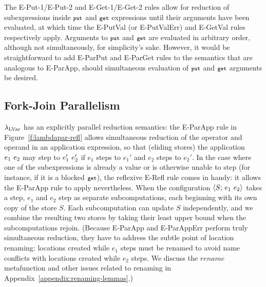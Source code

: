 The {\sc E-Put-1/E-Put-2} and {\sc E-Get-1/E-Get-2} rules allow for
reduction of subexpressions inside $\mbox{\footnotesize \texttt{put}}$ and $\mbox{\footnotesize \texttt{get}}$ expressions until
their arguments have been evaluated, at which time the {\sc E-PutVal}
(or {\sc E-PutValErr}) and {\sc E-GetVal} rules respectively apply.
Arguments to $\mbox{\footnotesize \texttt{put}}$ and $\mbox{\footnotesize \texttt{get}}$ are evaluated in arbitrary order,
although not simultaneously, for simplicity's sake.
However, it would be straightforward to
add {\sc E-ParPut} and {\sc E-ParGet} rules to the semantics that are analogous
to {\sc E-ParApp}, should simultaneous evaluation of $\mbox{\footnotesize \texttt{put}}$ and $\mbox{\footnotesize \texttt{get}}$
arguments be desired.

\FigLambdaparGrammar

\FigLambdaparRefl




\subsection{Fork-Join Parallelism}\label{subsection:fork-join}


$\textup{\ensuremath{\lambda_{\textrm{LVar}}}}$ has an explicitly parallel reduction semantics: the {\sc
  E-ParApp} rule in Figure~\ref{f:lambdapar-refl} allows simultaneous
reduction of the operator and operand in an application expression, so
that (eliding stores) the application $e_1~e_2$ may step to
$e_1'~e_2'$ if $e_1$ steps to $e_1'$ and $e_2$ steps to $e_2'$.
In the case where one of the subexpressions is already a value
or is otherwise unable to step (for instance, if it is
a blocked $\mbox{\footnotesize \texttt{get}}$), the reflexive {\sc E-Refl}
rule comes in handy: it allows the {\sc E-ParApp} rule to apply
nevertheless.
When the configuration $\langle S;\, e_1~e_2 \rangle$ takes a step,
$e_1$ and $e_2$ step as separate subcomputations, each beginning with
its own copy of the store $S$.  Each subcomputation can update $S$
independently, and we combine the resulting two stores by taking their least
upper bound when the subcomputations rejoin.
(Because {\sc E-ParApp} and {\sc E-ParAppErr} perform
truly simultaneous reduction, they have to address the subtle point of
location renaming: locations
  created while $e_1$ steps must be renamed to avoid name conflicts
  with locations created while $e_2$ steps.  We discuss the
  $\mathit{rename}$ metafunction 
  and other issues related to renaming in Appendix~\ref{appendix:renaming-lemmas}.)

